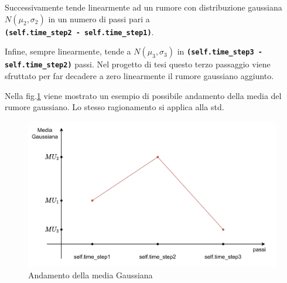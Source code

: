 Successivamente tende linearmente ad un rumore con distribuzione gaussiana $N(\mu_2,\sigma_2)$ in un numero di passi pari a \\\textbf{\texttt{(self.time\_step2 - self.time\_step1)}}.
\newline

Infine, sempre linearmente, tende a $N(\mu_3,\sigma_3)$ in \textbf{\texttt{(self.time\_step3 - self.time\_step2)}} passi. Nel progetto di tesi questo terzo passaggio viene sfruttato per far decadere a zero linearmente il rumore gaussiano aggiunto.
\newline

Nella fig.\ref{fig:tv_noise_media} viene mostrato un esempio di possibile andamento della media del rumore gaussiano. Lo stesso ragionamento si applica alla std.

\begin{figure}[hb]
    \center
    \includegraphics[width = 5in]{Figures/Appendix/tvnoise_media.drawio.pdf}
    \caption{Andamento della media Gaussiana}
    \label{fig:tv_noise_media}
\end{figure}